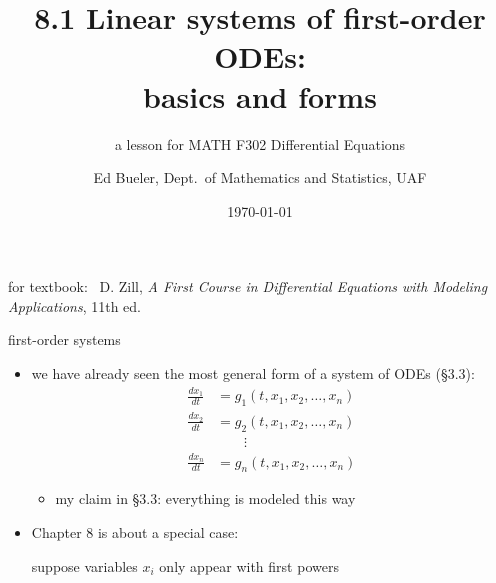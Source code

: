 \documentclass[urlcolor=blue,dvipsnames]{beamer}
\title{8.1 Linear systems of first-order ODEs: \\ basics and forms}
\subtitle{a lesson for MATH F302 Differential Equations}
\author{Ed Bueler, Dept.~of Mathematics and Statistics, UAF}
\date{\tiny \today}
\begin{document}
\renewcommand{\thefootnote}{{\color{green} \arabic{footnote}}}

\begin{frame}
\titlepage

\centerline{\tiny for textbook: \, D. Zill, \emph{A First Course in Differential Equations with Modeling Applications}, 11th ed.}
\end{frame}

\newcommand{\LL}[1]{\mathcal{L}\left\{#1\right\}}
\newcommand{\LLi}[1]{\mathcal{L}^{-1}\left\{#1\right\}}


\begin{frame}{first-order systems}

\begin{itemize}
\item we have already seen the most general form of a system of ODEs (\S3.3):
\begin{align*}
\frac{dx_1}{dt} &= g_1(t,x_1,x_2,\dots,x_n) \\
\frac{dx_2}{dt} &= g_2(t,x_1,x_2,\dots,x_n) \\
                &\qquad \vdots \\
\frac{dx_n}{dt} &= g_n(t,x_1,x_2,\dots,x_n)
\end{align*}
     \begin{itemize}
     \item my claim in \S3.3: everything is modeled this way
     \end{itemize}
\item Chapter 8 is about a special case:

\centerline{\alert{suppose variables $x_i$ only appear with first powers}}
\end{itemize}
\end{frame}
\end{document}
